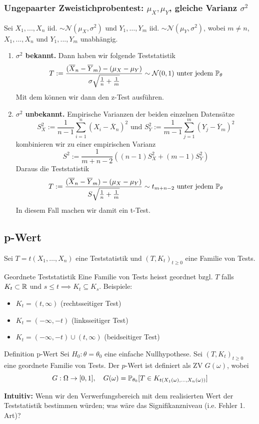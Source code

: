 \subsubsection*{Ungepaarter Zweistichprobentest: $\mu_X, \mu_Y$, gleiche Varianz $\sigma^2$}
Sei $X_1, ..., X_n$ iid. $\sim \mathcal{N}(\mu_X, \sigma^2)$ und $Y_1, \dots, Y_m$ iid. $\sim \mathcal{N}(\mu_Y, \sigma^2)$, wobei $m \neq n$, $X_1, ..., X_n$ und  $Y_1, ..., Y_m$ unabhängig.
\begin{enumerate}
	\item \textbf{$\sigma^2$ bekannt.} Dann haben wir folgende Teststatistik
	\[T := \frac{(\overline{X}_n -\overline{Y}_m) - (\mu_X - \mu_Y)}{\sigma\sqrt{\frac{1}{n}+\frac{1}{m}}} \sim \mathcal{N}(0,1) \text{ unter jedem }\P_{\theta}\]
	Mit dem können wir dann den z-Test ausführen.
	\item \textbf{$\sigma^2$ unbekannt.} Empirische Varianzen der beiden einzelnen Datensätze
	\[S^2_X := \frac{1}{n-1}\sum_{i=1}^n(X_i - \overline{X}_n)^2 \text{ und } S^2_Y := \frac{1}{m-1}\sum_{j=1}^m(Y_j - \overline{Y}_m)^2\]
	kombinieren wir zu einer empirischen Varianz
	\[S^2 := \frac{1}{m+n-2}((n-1)S^2_X + (m-1)S_Y^2)\]
	Daraus die Teststatistik
	\[T := \frac{(\overline{X}_n -\overline{Y}_m) - (\mu_X - \mu_Y)}{S\sqrt{\frac{1}{n}+\frac{1}{m}}} \sim t_{m+n-2} \text{ unter jedem }\P_{\theta}\]
	In diesem Fall machen wir damit ein t-Test.
\end{enumerate}
\subsection{p-Wert}
Sei \(T = t(X_1, \ldots, X_n)\) eine Teststatistik und \((T,K_t)_{t\ge 0}\) eine Familie von Tests.

\begin{subbox}{Geordnete Teststatistik}
	Eine Familie von Tests heisst geordnet bzgl. \(T\) falls \(K_t \subset \R\) und \(s \le t \implies K_t \subseteq K_s\). Beispiele:
	\begin{itemize}
		\item \(K_t = (t, \infty)\) (rechtsseitiger Test)
		\item \(K_t = (-\infty, -t)\) (linksseitiger Test)
		\item \(K_t = (-\infty, -t) \cup (t, \infty)\) (beidseitiger Test)
	\end{itemize}
\end{subbox}

\begin{mainbox}{Definition p-Wert}
	Sei \(H_0: \theta = \theta_0\) eine einfache Nullhypothese. Sei \((T, K_t)_{t\ge 0}\) eine geordnete Familie von Tests. Der \(p\)-Wert ist definiert als ZV \(G(\omega)\), wobei
	\[G: \Omega \to [0,1], \quad G(\omega) = \P_{\theta_0}[T \in K_{t(X_1(\omega), ..., X_n(\omega))}]\]
\end{mainbox}
\textbf{Intuitiv: } Wenn wir den Verwerfungsbereich mit dem realisierten Wert der Teststatistik bestimmen würden; was wäre das Signifikanzniveau (i.e. Fehler 1. Art)?

